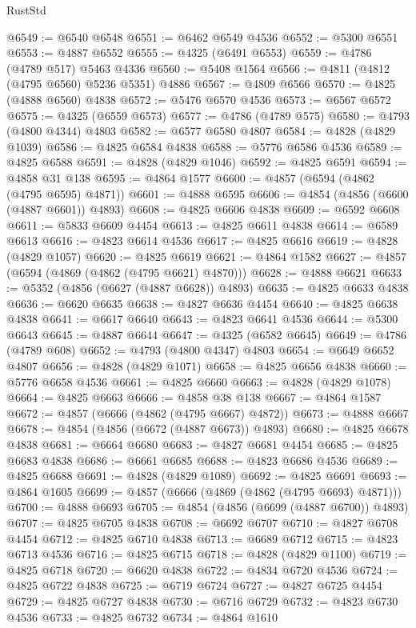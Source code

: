 \begin{lexlean}{RustStd}
\begin{coremodule}
@6549 := @6540 @6548
@6551 := @6462 @6549 @4536
@6552 := @5300 @6551
@6553 := @4887 @6552
@6555 := @4325 (@6491 @6553)
@6559 := @4786 (@4789 @517) @5463 @4336
@6560 := @5408 @1564
@6566 := @4811 (@4812 (@4795 @6560) @5236 @5351) @4886
@6567 := @4809 @6566
@6570 := @4825 (@4888 @6560) @4838
@6572 := @5476 @6570 @4536
@6573 := @6567 @6572
@6575 := @4325 (@6559 @6573)
@6577 := @4786 (@4789 @575)
@6580 := @4793 (@4800 @4344) @4803
@6582 := @6577 @6580 @4807
@6584 := @4828 (@4829 @1039)
@6586 := @4825 @6584 @4838
@6588 := @5776 @6586 @4536
@6589 := @4825 @6588
@6591 := @4828 (@4829 @1046)
@6592 := @4825 @6591
@6594 := @4858 @31 @138
@6595 := @4864 @1577
@6600 := @4857 (@6594 (@4862 (@4795 @6595) @4871))
@6601 := @4888 @6595
@6606 := @4854 (@4856 (@6600 (@4887 @6601)) @4893)
@6608 := @4825 @6606 @4838
@6609 := @6592 @6608
@6611 := @5833 @6609 @4454
@6613 := @4825 @6611 @4838
@6614 := @6589 @6613
@6616 := @4823 @6614 @4536
@6617 := @4825 @6616
@6619 := @4828 (@4829 @1057)
@6620 := @4825 @6619
@6621 := @4864 @1582
@6627 := @4857 (@6594 (@4869 (@4862 (@4795 @6621) @4870)))
@6628 := @4888 @6621
@6633 := @5352 (@4856 (@6627 (@4887 @6628)) @4893)
@6635 := @4825 @6633 @4838
@6636 := @6620 @6635
@6638 := @4827 @6636 @4454
@6640 := @4825 @6638 @4838
@6641 := @6617 @6640
@6643 := @4823 @6641 @4536
@6644 := @5300 @6643
@6645 := @4887 @6644
@6647 := @4325 (@6582 @6645)
@6649 := @4786 (@4789 @608)
@6652 := @4793 (@4800 @4347) @4803
@6654 := @6649 @6652 @4807
@6656 := @4828 (@4829 @1071)
@6658 := @4825 @6656 @4838
@6660 := @5776 @6658 @4536
@6661 := @4825 @6660
@6663 := @4828 (@4829 @1078)
@6664 := @4825 @6663
@6666 := @4858 @38 @138
@6667 := @4864 @1587
@6672 := @4857 (@6666 (@4862 (@4795 @6667) @4872))
@6673 := @4888 @6667
@6678 := @4854 (@4856 (@6672 (@4887 @6673)) @4893)
@6680 := @4825 @6678 @4838
@6681 := @6664 @6680
@6683 := @4827 @6681 @4454
@6685 := @4825 @6683 @4838
@6686 := @6661 @6685
@6688 := @4823 @6686 @4536
@6689 := @4825 @6688
@6691 := @4828 (@4829 @1089)
@6692 := @4825 @6691
@6693 := @4864 @1605
@6699 := @4857 (@6666 (@4869 (@4862 (@4795 @6693) @4871)))
@6700 := @4888 @6693
@6705 := @4854 (@4856 (@6699 (@4887 @6700)) @4893)
@6707 := @4825 @6705 @4838
@6708 := @6692 @6707
@6710 := @4827 @6708 @4454
@6712 := @4825 @6710 @4838
@6713 := @6689 @6712
@6715 := @4823 @6713 @4536
@6716 := @4825 @6715
@6718 := @4828 (@4829 @1100)
@6719 := @4825 @6718
@6720 := @6620 @4838
@6722 := @4834 @6720 @4536
@6724 := @4825 @6722 @4838
@6725 := @6719 @6724
@6727 := @4827 @6725 @4454
@6729 := @4825 @6727 @4838
@6730 := @6716 @6729
@6732 := @4823 @6730 @4536
@6733 := @4825 @6732
@6734 := @4864 @1610

\end{coremodule}
\end{lexlean}
